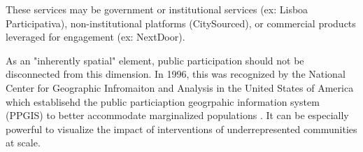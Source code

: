 These services may be government or institutional services (ex: Lisboa Participativa), non-institutional platforms (CitySourced), or commercial products leveraged for engagement (ex: NextDoor). %

As an "inherently spatial" element, public participation should not be disconnected from this dimension\cite{Acedo2019}. %
In 1996, this was recognized by the National Center for Geographic Infromaiton and Analysis in the United States of America which establisehd the public particiaption geogrpahic information system (PPGIS) to better accommodate marginalized populations \cite{Brown2012}. %
It can be especially powerful to visualize the impact of interventions of underrepresented communities at scale\cite{McQueenBaker2015}. %
